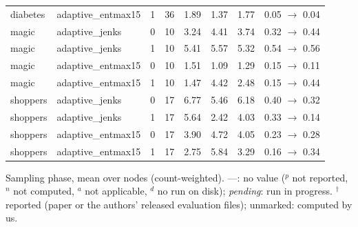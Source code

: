 \begin{table}[t]
{\begin{tabular}{llcccccc}
diabetes & adaptive\_entmax15 & 1 & 36 & 1.89 & 1.37 & 1.77 & 0.05 $\to$ 0.04 \\
magic & adaptive\_jenks & 0 & 10 & 3.24 & 4.41 & 3.74 & 0.32 $\to$ 0.44 \\
magic & adaptive\_jenks & 1 & 10 & 5.41 & 5.57 & 5.32 & 0.54 $\to$ 0.56 \\
magic & adaptive\_entmax15 & 0 & 10 & 1.51 & 1.09 & 1.29 & 0.15 $\to$ 0.11 \\
magic & adaptive\_entmax15 & 1 & 10 & 1.47 & 4.42 & 2.48 & 0.15 $\to$ 0.44 \\
shoppers & adaptive\_jenks & 0 & 17 & 6.77 & 5.46 & 6.18 & 0.40 $\to$ 0.32 \\
shoppers & adaptive\_jenks & 1 & 17 & 5.64 & 2.42 & 4.03 & 0.33 $\to$ 0.14 \\
shoppers & adaptive\_entmax15 & 0 & 17 & 3.90 & 4.72 & 4.05 & 0.23 $\to$ 0.28 \\
shoppers & adaptive\_entmax15 & 1 & 17 & 2.75 & 5.84 & 3.29 & 0.16 $\to$ 0.34 \\
\bottomrule
\end{tabular}}
\par\smallskip\footnotesize Sampling phase, mean over nodes (count-weighted). ---: no value ($^{p}$ not reported, $^{n}$ not computed, $^{a}$ not applicable, $^{d}$ no run on disk); \emph{pending}: run in progress. $^\dagger$reported (paper or the authors' released evaluation files); unmarked: computed by us.
\end{table}
